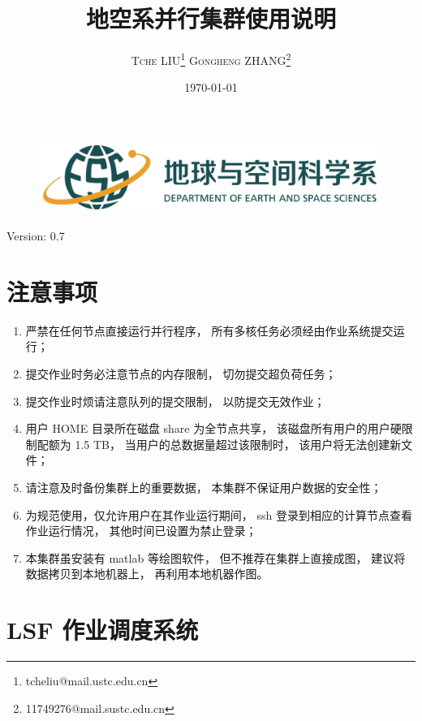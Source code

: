 \documentclass[UTF8]{ctexart}
\title{\vspace{10mm}\heiti\huge 地空系并行集群使用说明\vspace{30mm}}
\author{\LARGE\textsc{Tche LIU}\thanks{tcheliu@mail.ustc.edu.cn}\hspace{10mm}
\textsc{Gongheng ZHANG}\thanks{11749276@mail.sustc.edu.cn}
\vspace{10mm}}
\date{\today}
\begin{document}
\begin{figure}[t]
  \centering
  \includegraphics[width=125mm]{material/esslogo.png}
\end{figure}
\maketitle
\centerline{Version: 0.7}
\newpage

\tableofcontents
\newpage

\section{注意事项}
\begin{enumerate}[\hspace{15mm}（1）]
  \item 严禁在任何节点直接运行并行程序，
    所有多核任务必须经由作业系统提交运行；
  \item 提交作业时务必注意节点的内存限制，
    切勿提交超负荷任务；
  \item 提交作业时烦请注意队列的提交限制，
    以防提交无效作业；
  \item 用户 HOME 目录所在磁盘 share 为全节点共享，
    该磁盘所有用户的用户硬限制配额为 1.5 TB，
    当用户的总数据量超过该限制时，
    该用户将无法创建新文件；
  \item 请注意及时备份集群上的重要数据，
    本集群不保证用户数据的安全性；
  \item 为规范使用，仅允许用户在其作业运行期间，
    ssh 登录到相应的计算节点查看作业运行情况，
    其他时间已设置为禁止登录；
  \item 本集群虽安装有 matlab 等绘图软件，
    但不推荐在集群上直接成图，
    建议将数据拷贝到本地机器上，
    再利用本地机器作图。
\end{enumerate}

\section{LSF 作业调度系统}
\end{document}
